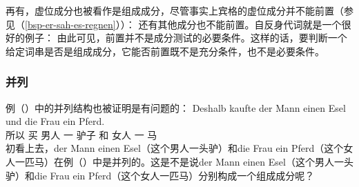 再有，虚位成分也被看作是组成成分，尽管事实上宾格的虚位成分并不能前置（参见（\ref{bsp-er-sah-es-regnen}））：
\eal
{}
\zl
还有其他成分也不能前置。自反身代词就是一个很好的例子：
\eal
{}
\zl
由此可见，前置并不是成分测试的必要条件。这样的话，要判断一个给定词串是否是组成成分，它能否前置既不是充分条件，也不是必要条件。


\subsubsection{并列}
\label{Abschnitt-K-Tests-Koordination}
例（）中的并列结构也被证明是有问题的：
\ea
\label{ex-gapping}
\gll Deshalb kaufte der Mann einen Esel und die Frau ein Pferd.\\
	 所以 买  男人 一 驴子 和  女人 一 马\\
\z
初看上去，der Mann einen Esel（这个男人一头驴）和die Frau ein Pferd（这个女人一匹马）在例（）中是并列的。这是不是说der Mann einen Esel（这个男人一头驴）和die Frau ein Pferd（这个女人一匹马）分别构成一个组成成分呢？

